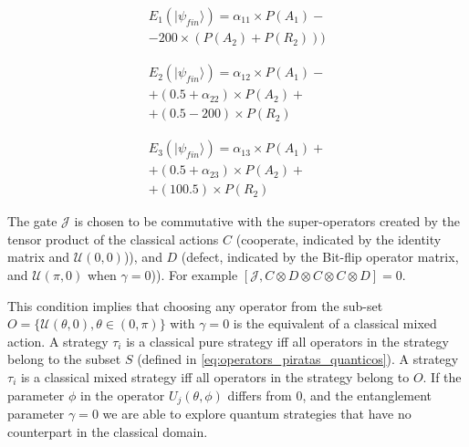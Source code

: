 \documentclass[10pt]{llncs}
\begin{document}
   

 
\begin{equation}
\begin{split}
E_{1}(\vert\psi_{fin}\rangle)=\alpha_{11}\times P(A_{1}) - \\ 
 - 200\times( P(A_{2})  +  P(R_{2}) ) 
 ) 
\end{split}
\label{eq:pirates_payoff32:1}
\end{equation}

\begin{equation}
\begin{split}
E_{2}(\vert\psi_{fin}\rangle)=\alpha_{12}\times P(A_{1}) - \\
 + (0.5 + \alpha_{22})\times P(A_{2})  + \\ 
+(0.5-200)\times P(R_{2})
\end{split}
\label{eq:pirates_payoff32:2}
\end{equation}

\begin{equation}
\begin{split}
E_{3}(\vert\psi_{fin}\rangle)=\alpha_{13}\times P(A_{1}) + \\
 + (0.5 + \alpha_{23})\times P(A_{2})   + \\
 + (100.5)\times P(R_{2}) 
\end{split}
\label{eq:pirates_payoff32:3}
\end{equation}



The gate $\mathcal{J}$ is chosen to be commutative with the super-operators created by the tensor product of the classical actions $C$ (cooperate, indicated by the identity matrix and $\mathcal{U}(0,0)$)), and $D$ (defect, indicated by the Bit-flip operator matrix, and $\mathcal{U}(\pi,0)$ when $\gamma = 0$)). For example $[ \mathcal{J} , C \otimes D \otimes C \otimes C \otimes D ] = 0 $.


This condition implies that choosing any operator from the sub-set $O = \{ \mathcal{U} ( \theta , 0) , \theta \in (0, \pi) \}$ with $\gamma = 0$ is the equivalent of a classical mixed action. A strategy $\tau_{i}$ is a classical pure strategy iff all operators in the strategy belong to the subset $S$ (defined in \eqref{eq:operators_piratas_quanticos}). A strategy $\tau_{i}$ is a classical mixed strategy iff all operators in the strategy belong to $O$.
If the parameter $\phi$ in the operator $U_{j}(\theta ,\phi)$ differs from $0$, and the entanglement parameter $\gamma = 0$ we are able to explore quantum strategies that have no counterpart in the classical domain\cite{Eisert2008}.
\end{document}
